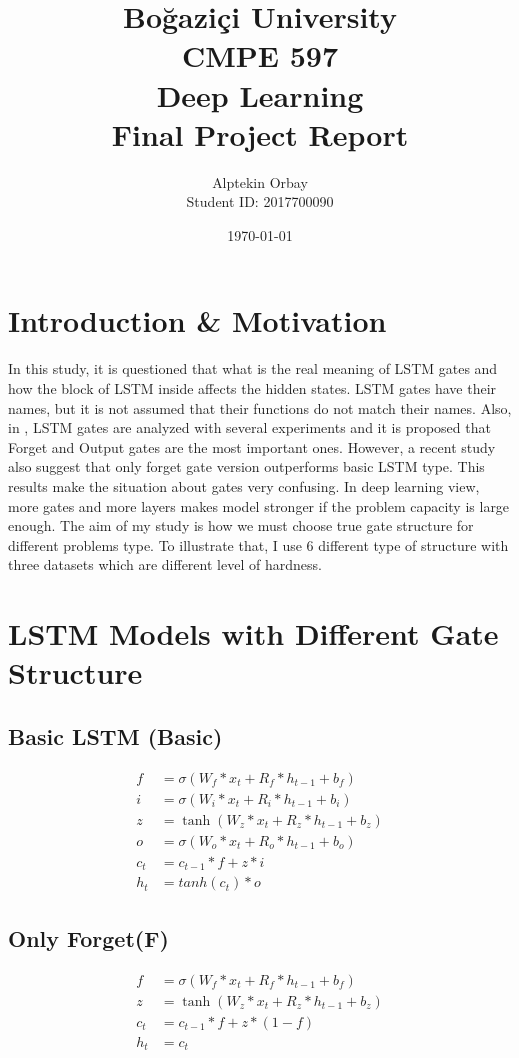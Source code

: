 \documentclass[12pt, letterpaper]{article}
\title{ Bo\u{g}azi\c{c}i University\\CMPE 597  \\
   \large  Deep Learning\\
    Final Project Report
}
\author{Alptekin Orbay \\ Student ID: 2017700090}
\date{\today}
\begin{document}
\begin{titlepage}
  \maketitle
\end{titlepage}
\newpage
\tableofcontents
\newpage
\section{Introduction \& Motivation}
	In this study, it is questioned that what is the real meaning of LSTM gates and how the block of LSTM inside affects the hidden states. LSTM gates have their names, but it is not assumed that their functions do not match their names. Also, in \cite{1}, LSTM gates are analyzed with several experiments and it is proposed that Forget and Output gates are the most important ones. However, a recent study \cite{2} also suggest that only forget gate version outperforms basic LSTM type. This results make the situation about gates very confusing. In deep learning view, more gates and more layers makes model stronger if the problem capacity is large enough. The aim of my study is how we must choose true gate structure for different problems type. To illustrate that, I use 6 different type of structure with three datasets which are different level of hardness. 
\section{LSTM Models with Different Gate Structure }
\subsection{Basic LSTM (Basic)}
\begin{align*}
	f &= \sigma(W_f * x_{t} + R_f * h_{t-1} + b_f) \\
	i &= \sigma(W_i * x_{t} + R_i * h_{t-1} + b_i) \\
	z &= \tanh(W_z * x_{t} + R_z * h_{t-1} + b_z) \\ 
	o &= \sigma(W_o * x_{t} + R_o * h_{t-1} + b_o) \\
	c_t &= c_{t-1} * f + z * i \\
	h_t &= tanh(c_t) * o
\end{align*}
\subsection{Only Forget(F)}
\begin{align*}
	f &= \sigma(W_f * x_{t} + R_f * h_{t-1} + b_f) \\
	z &= \tanh(W_z * x_{t} + R_z * h_{t-1} + b_z) \\ 
	c_t &= c_{t-1} * f + z * (1-f) \\
	h_t &= c_t
\end{align*}
\end{document}
